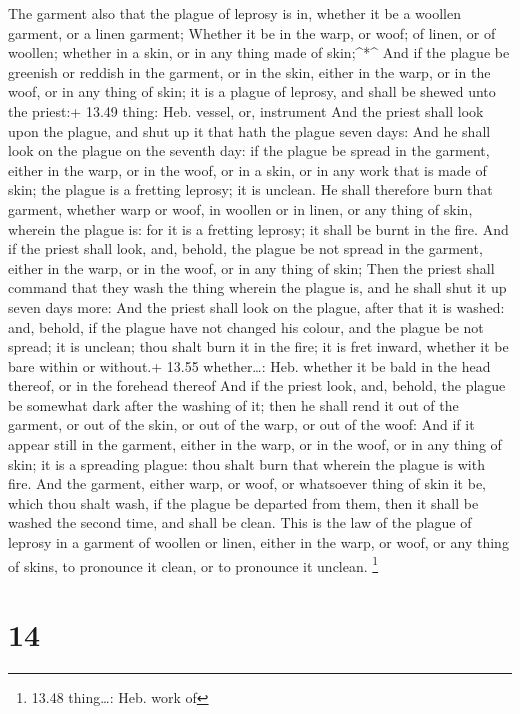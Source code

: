 The garment also that the plague of leprosy is in, whether
it be a woollen garment, or a linen garment;  Whether it be
in the warp, or woof; of linen, or of woollen; whether in a skin, or in
any thing made of skin;\^{}*\^{}  And if the plague be
greenish or reddish in the garment, or in the skin, either in the warp,
or in the woof, or in any thing of skin; it is a plague of leprosy, and
shall be shewed unto the priest:+ 13.49 thing: Heb. vessel, or,
instrument  And the priest shall look upon the plague, and
shut up it that hath the plague seven days:  And he shall
look on the plague on the seventh day: if the plague be spread in the
garment, either in the warp, or in the woof, or in a skin, or in any
work that is made of skin; the plague is a fretting leprosy; it is
unclean.  He shall therefore burn that garment, whether
warp or woof, in woollen or in linen, or any thing of skin, wherein the
plague is: for it is a fretting leprosy; it shall be burnt in the fire.
 And if the priest shall look, and, behold, the plague be
not spread in the garment, either in the warp, or in the woof, or in any
thing of skin;  Then the priest shall command that they
wash the thing wherein the plague is, and he shall shut it up seven days
more:  And the priest shall look on the plague, after that
it is washed: and, behold, if the plague have not changed his colour,
and the plague be not spread; it is unclean; thou shalt burn it in the
fire; it is fret inward, whether it be bare within or without.+ 13.55
whether\ldots: Heb. whether it be bald in the head thereof, or in the
forehead thereof  And if the priest look, and, behold, the
plague be somewhat dark after the washing of it; then he shall rend it
out of the garment, or out of the skin, or out of the warp, or out of
the woof:  And if it appear still in the garment, either in
the warp, or in the woof, or in any thing of skin; it is a spreading
plague: thou shalt burn that wherein the plague is with fire.
 And the garment, either warp, or woof, or whatsoever thing
of skin it be, which thou shalt wash, if the plague be departed from
them, then it shall be washed the second time, and shall be clean.
 This is the law of the plague of leprosy in a garment of
woollen or linen, either in the warp, or woof, or any thing of skins, to
pronounce it clean, or to pronounce it unclean. \footnote{13.48
  thing\ldots: Heb. work of}

\hypertarget{section-13}{%
\section{14}\label{section-13}}

